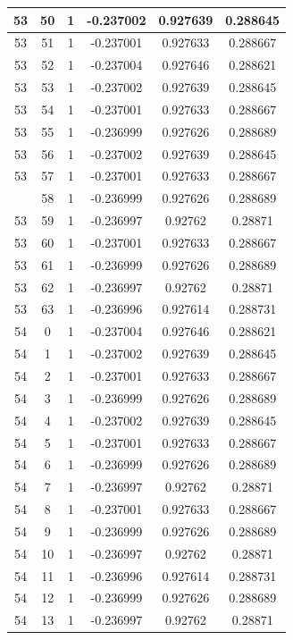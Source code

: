 \documentclass[12pt,a4paper]{article}
\numberwithin{equation}{section}
\numberwithin{figure}{section}
\numberwithin{table}{section}
\begin{document}
\begin{longtable}{|c|c|c|c|c|c|}
53 & 50 & 1 & -0.237002 & 0.927639 & 0.288645 \\ \hline
53 & 51 & 1 & -0.237001 & 0.927633 & 0.288667 \\ \hline
53 & 52 & 1 & -0.237004 & 0.927646 & 0.288621 \\ \hline
53 & 53 & 1 & -0.237002 & 0.927639 & 0.288645 \\ \hline
53 & 54 & 1 & -0.237001 & 0.927633 & 0.288667 \\ \hline
53 & 55 & 1 & -0.236999 & 0.927626 & 0.288689 \\ \hline
53 & 56 & 1 & -0.237002 & 0.927639 & 0.288645 \\ \hline
53 & 57 & 1 & -0.237001 & 0.927633 & 0.288667 \\ \hline
\pagebreak
53 & 58 & 1 & -0.236999 & 0.927626 & 0.288689 \\ \hline
53 & 59 & 1 & -0.236997 & 0.92762 & 0.28871 \\ \hline
53 & 60 & 1 & -0.237001 & 0.927633 & 0.288667 \\ \hline
53 & 61 & 1 & -0.236999 & 0.927626 & 0.288689 \\ \hline
53 & 62 & 1 & -0.236997 & 0.92762 & 0.28871 \\ \hline
53 & 63 & 1 & -0.236996 & 0.927614 & 0.288731 \\ \hline
54 & 0 & 1 & -0.237004 & 0.927646 & 0.288621 \\ \hline
54 & 1 & 1 & -0.237002 & 0.927639 & 0.288645 \\ \hline
54 & 2 & 1 & -0.237001 & 0.927633 & 0.288667 \\ \hline
54 & 3 & 1 & -0.236999 & 0.927626 & 0.288689 \\ \hline
54 & 4 & 1 & -0.237002 & 0.927639 & 0.288645 \\ \hline
54 & 5 & 1 & -0.237001 & 0.927633 & 0.288667 \\ \hline
54 & 6 & 1 & -0.236999 & 0.927626 & 0.288689 \\ \hline
54 & 7 & 1 & -0.236997 & 0.92762 & 0.28871 \\ \hline
54 & 8 & 1 & -0.237001 & 0.927633 & 0.288667 \\ \hline
54 & 9 & 1 & -0.236999 & 0.927626 & 0.288689 \\ \hline
54 & 10 & 1 & -0.236997 & 0.92762 & 0.28871 \\ \hline
54 & 11 & 1 & -0.236996 & 0.927614 & 0.288731 \\ \hline
54 & 12 & 1 & -0.236999 & 0.927626 & 0.288689 \\ \hline
54 & 13 & 1 & -0.236997 & 0.92762 & 0.28871 \\ \hline

\end{longtable}
\end{document}
